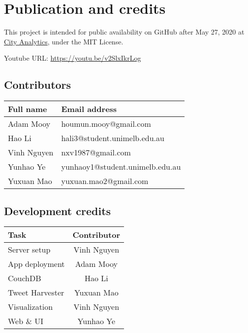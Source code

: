 \section{Publication and credits}
This project is intended for public availability on GitHub after May 27, 2020 at \href{https://github.com/nxv1987/UniMelb---Cluster-and-Cloud-Computing-COMP90024-2020-SM1/tree/master/city_analytics}{City Analytics}, under the MIT License. 

Youtube URL: \url{https://youtu.be/v2SlxIkrLog}

\subsection{Contributors}
\begin{center}
\begin{tabular}{ |l|l| } 
\hline
\textbf{Full name} & \textbf{Email address} \\
\hline
Adam Mooy & houmun.mooy@gmail.com \\
Hao Li & hali3@student.unimelb.edu.au \\
Vinh Nguyen & nxv1987@gmail.com \\
Yunhao Ye & yunhaoy1@student.unimelb.edu.au \\
Yuxuan Mao & yuxuan.mao2@gmail.com \\
\hline
\end{tabular}
\end{center}

\subsection{Development credits}
\begin{center}
\begin{tabular}{ |l|c| } 
\hline
\textbf{Task} & \textbf{Contributor} \\
\hline
Server setup & Vinh Nguyen \\
App deployment & Adam Mooy \\
CouchDB & Hao Li \\
Tweet Harvester & Yuxuan Mao \\
Visualization & Vinh Nguyen \\
Web \& UI & Yunhao Ye \\
\hline
\end{tabular}
\end{center}

